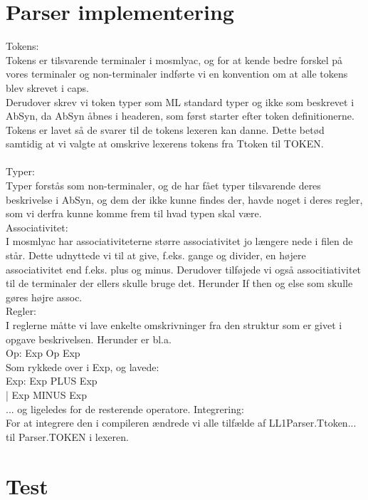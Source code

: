 \documentclass[11pt,a4paper]{article}
\begin{document}
\section*{Parser implementering}
Tokens:\\
Tokens er tilsvarende terminaler i mosmlyac, og for at kende bedre forskel på vores terminaler og non-terminaler indførte vi en konvention om at alle tokens blev skrevet i caps.\\
Derudover skrev vi token typer som ML standard typer og ikke som beskrevet i AbSyn, da AbSyn åbnes i headeren, som først starter efter token definitionerne.\\
Tokens er lavet så de svarer til de tokens lexeren kan danne. Dette betød samtidig at vi valgte at omskrive lexerens tokens fra Ttoken til TOKEN.\\
\\
Typer:\\
Typer forstås som non-terminaler, og de har fået typer tilsvarende deres beskrivelse i AbSyn, og dem der ikke kunne findes der, havde noget i deres regler, som vi derfra kunne komme frem til hvad typen skal være.
\\
Associativitet:\\
I mosmlyac har associativiteterne større associativitet jo længere nede i filen de står. Dette udnyttede vi til at give, f.eks. gange og divider, en højere associativitet end f.eks. plus og minus. Derudover tilføjede vi også associtiativitet til de terminaler der ellers skulle bruge det. Herunder If then og else som skulle gøres højre assoc.\\
Regler:\\
I reglerne måtte vi lave enkelte omskrivninger fra den struktur som er givet i opgave beskrivelsen. Herunder er bl.a. \\
Op: Exp Op Exp\\
Som rykkede over i Exp, og lavede:\\
Exp: Exp PLUS Exp\\
   | Exp MINUS Exp\\
... og ligeledes for de resterende operatore.
Integrering:\\
For at integrere den i compileren ændrede vi alle tilfælde af LL1Parser.Ttoken... til Parser.TOKEN i lexeren.



\section*{Test}
\end{document}
